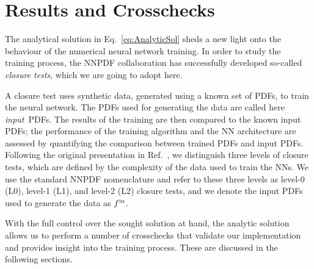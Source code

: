 \newpage
\section{Results and Crosschecks}
\label{sec:TrainClosure}

The analytical solution in Eq.~\eqref{eq:AnalyticSol} sheds a new light onto the
behaviour of the numerical neural network training. In order to study the
training process, the NNPDF collaboration has successfully developed so-called
{\em closure tests}, which we are going to adopt here. 

A closure test uses synthetic data, generated using a known set of PDFs, to
train the neural network. The PDFs used for generating the data are called here
{\em input}\ PDFs. The results of the training are then compared to the known
input PDFs; the performance of the training algorithm and the NN architecture
are assessed by quantifying the comparison between trained PDFs and input PDFs.
Following the original presentation in Ref.~\cite{NNPDF:2014otw}, we distinguish
three levels of closure tests, which are defined by the complexity of the data
used to train the NNs. We use the standard NNPDF nomenclature and refer to these
three levels as level-0 (L0), level-1 (L1), and level-2 (L2) closure tests, and
we denote the input PDFs used to generate the data as $f^{\rm in}$.

With the full control over the sought solution at hand, the analytic solution
allows us to perform a number of crosschecks that validate our implementation
and provides insight into the training process. These are discussed in the
following sections.


